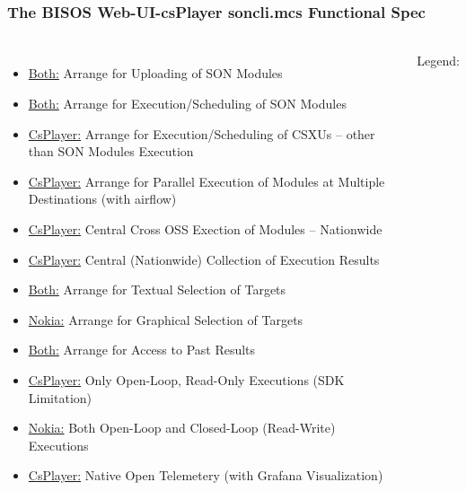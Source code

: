 \begin{verblatex}

\begin{frame}[fragile,plain,label=webUiCsPlayer]
    \frametitle{The BISOS Web-UI-csPlayer soncli.mcs Functional Spec}
    \framesubtitle{}


\begin{small}
\begin{columns}[T]

\begin{itemize}
  \item {\color{darkblue} \underline{Both:} Arrange for Uploading of SON Modules}
  \item {\color{darkblue} \underline{Both:} Arrange for Execution/Scheduling of SON Modules}
  \item {\color{darkgreen} \underline{CsPlayer:} Arrange for Execution/Scheduling of CSXUs -- other than SON Modules Execution}
  \item {\color{darkgreen} \underline{CsPlayer:} Arrange for Parallel Execution of Modules at Multiple Destinations (with airflow)}
  \item {\color{darkgreen} \underline{CsPlayer:} Central Cross OSS Exection of Modules -- Nationwide}
  \item {\color{darkgreen} \underline{CsPlayer:} Central (Nationwide) Collection of Execution Results}
  \item {\color{darkblue} \underline{Both:} Arrange for Textual Selection of Targets}
  \item {\color{blue} \underline{Nokia:} Arrange for Graphical Selection of Targets}
  \item {\color{darkblue} \underline{Both:} Arrange for Access to Past Results}
  \item {\color{darkgreen} \underline{CsPlayer:} Only Open-Loop, Read-Only Executions (SDK Limitation)}
  \item {\color{blue} \underline{Nokia:} Both Open-Loop and Closed-Loop (Read-Write) Executions}
  \item {\color{darkgreen} \underline{CsPlayer:} Native Open Telemetery (with Grafana Visualization)}
\end{itemize}


   \begin{center}
      Legend:
    \end{center}



\end{columns}
\end{small}
\end{frame}
\end{verblatex}
